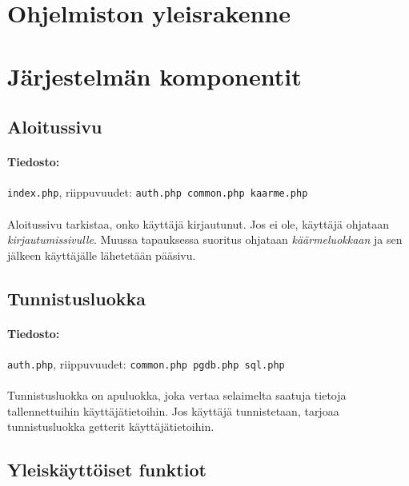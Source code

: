 \documentclass[11pt]{article}
\begin{document}

\section{Ohjelmiston yleisrakenne}


\section{Järjestelmän komponentit}

\subsection{Aloitussivu}

\paragraph{Tiedosto:} \large{\texttt{index.php}}, riippuvuudet: \texttt{auth.php common.php kaarme.php}

\paragraph{} Aloitussivu tarkistaa, onko käyttäjä kirjautunut. Jos ei ole, käyttäjä ohjataan \emph{kirjautumissivulle}. Muussa tapauksessa suoritus ohjataan \emph{käärmeluokkaan} ja sen jälkeen käyttäjälle lähetetään pääsivu.


\subsection{Tunnistusluokka}

\paragraph{Tiedosto:} \large{\texttt{auth.php}}, riippuvuudet: \texttt{common.php pgdb.php sql.php}

\paragraph{} Tunnistusluokka on apuluokka, joka vertaa selaimelta saatuja tietoja tallennettuihin käyttäjätietoihin. Jos käyttäjä tunnistetaan, tarjoaa tunnistusluokka getterit käyttäjätietoihin.


\subsection{Yleiskäyttöiset funktiot}
\end{document}
